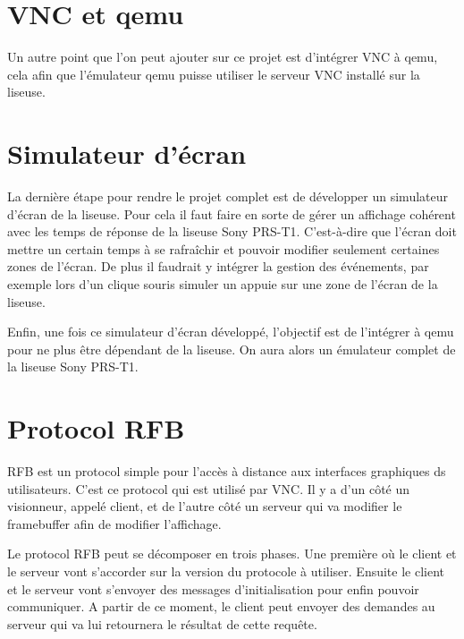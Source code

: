 \section{VNC et qemu}

Un autre point que l'on peut ajouter sur ce projet est d'intégrer VNC à qemu, cela afin que l'émulateur qemu puisse utiliser le serveur VNC installé sur la liseuse.


\section{Simulateur d'écran}

La dernière étape pour rendre le projet complet est de développer un simulateur d'écran de la liseuse. Pour cela il faut faire en sorte de gérer un affichage cohérent avec les temps de réponse de la liseuse Sony PRS-T1. C'est-à-dire que l'écran doit mettre un certain temps à se rafraîchir et pouvoir modifier seulement certaines zones de l'écran. De plus il faudrait y intégrer la gestion des événements, par exemple lors d'un clique souris simuler un appuie sur une zone de l'écran de la liseuse.

Enfin, une fois ce simulateur d'écran développé, l'objectif est de l'intégrer à qemu pour ne plus être dépendant de la liseuse. On aura alors un émulateur complet de la liseuse Sony PRS-T1.


\section{Protocol RFB}

RFB est un protocol simple pour l'accès à distance aux interfaces graphiques ds utilisateurs. C'est ce protocol qui est utilisé par VNC. Il y a d'un côté un visionneur, appelé client, et de l'autre côté un serveur qui va modifier le framebuffer afin de modifier l'affichage.

Le protocol RFB peut se décomposer en trois phases. Une première où le client et le serveur vont s'accorder sur la version du protocole à utiliser. Ensuite le client et le serveur vont s'envoyer des messages d'initialisation pour enfin pouvoir communiquer. A partir de ce moment, le client peut envoyer des demandes au serveur qui va lui retournera le résultat de cette requête.

